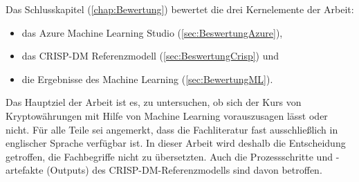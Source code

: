 Das Schlusskapitel (\ref{chap:Bewertung}) bewertet die drei Kernelemente der Arbeit:
\begin{itemize}
\item das Azure Machine Learning Studio (\ref{sec:BeswertungAzure}),
\item das CRISP-DM Referenzmodell (\ref{sec:BeswertungCrisp}) und
\item die Ergebnisse des Machine Learning (\ref{sec:BewertungML}).
\end{itemize}
Das Hauptziel der Arbeit ist es, zu untersuchen, ob sich der Kurs von Kryptowährungen mit Hilfe von Machine Learning vorauszusagen lässt oder nicht.\newline
Für alle Teile sei angemerkt, dass die Fachliteratur fast ausschließlich in englischer Sprache verfügbar ist. In dieser Arbeit wird deshalb die Entscheidung getroffen, die Fachbegriffe nicht zu übersetzten. Auch die Prozessschritte und -artefakte (Outputs) des CRISP-DM-Referenzmodells sind davon betroffen. 

